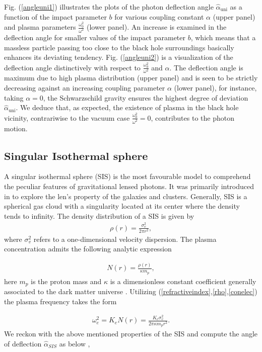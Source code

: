 \documentclass[final,5p,times,twocolumn,unknownkeysallowed]{elsarticle}
\begin{document}
Fig. (\ref{angleuni1}) illustrates the plots of the photon deflection angle $\hat{\alpha}_{\mathrm{uni}}$ as a function of the
impact parameter $b$ for various coupling constant $\alpha$ (upper panel) and plasma parameters $\frac{\omega^2_{0}}{\omega^2}$ (lower panel).
An increase is examined in the deflection angle for smaller values of the impact parameter $b$, which means that
a massless particle passing too close to the black hole surroundings basically enhances its deviating tendency.
Fig. (\ref{angleuni2}) is a visualization of the deflection angle distinctively with respect to $\frac{\omega^2_{0}}{\omega^2}$ and $\alpha$.
The deflection angle is maximum due to high plasma distribution (upper panel) and is seen to be strictly decreasing
against an increasing coupling parameter $\alpha$ (lower panel), for instance, taking $\alpha=0$, the Schwarzschild
gravity ensures the highest degree of deviation $\hat{\alpha}_\mathrm{uni}$. We deduce that, as expected, the existence of plasma in the black hole vicinity, contrariwise to the vacuum case $\frac{\omega^2_{0}}{\omega^2}=0$, contributes to
the photon motion.

\subsection{$\mathbf{Singular}$ $\mathbf{Isothermal}$ $\mathbf{sphere}$}
A singular isothermal sphere (SIS) is the most favourable model to comprehend the peculiar features of gravitational lensed photons. It
was primarily introduced in \cite{Chnd:1939a,Jbin:1987a} to explore the len's property of the galaxies and clusters.
Generally, SIS is a spherical gas cloud with a singularity located at its center where the density tends to
infinity. The density distribution of a SIS is given by
\begin{align}
\rho(r)=\frac{\sigma^2_{v}}{2\pi r^2},\label{rho}
\end{align}
where $\sigma^2_{v}$ refers to a one-dimensional velocity dispersion. The plasma concentration
admits the following analytic expression

\begin{align}
N(r)=\frac{\rho(r)}{\kappa m_p},\label{conelec}
\end{align}
here $m_p$ is the proton mass and $\kappa$ is a dimensionless
constant coefficient generally associated to the dark matter universe \cite{Bin:2010a}.
Utilizing (\ref{refractiveindex},\ref{rho},\ref{conelec}) the plasma frequency takes the form

\begin{align}
\omega^2_{e}=K_eN(r)=\frac{K_e\sigma^2_{v}}{2\pi \kappa m_p r^2}.
\end{align}
We reckon with the above mentioned  properties of the SIS and compute the angle of deflection $\hat{\alpha}_{SIS}$ as below \cite{Bin:2010a},
\end{document}
